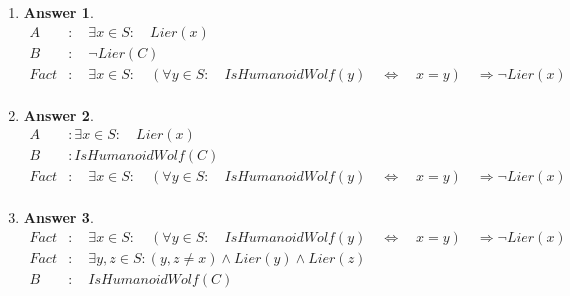 \documentclass[a4paper]{article}
\renewcommand{\(}{\left(}
\renewcommand{\)}{\right)}
\theoremstyle{plain}
\theoremstyle{plain}
\theoremstyle{definition}
\newtheorem*{answer}{Answer}
\begin{document}
\begin{enumerate}[label*=\alph*.,ref=\alph*]
\item \quad
\begin{shaded}
\begin{answer}
\begin{align*}
  A &: \quad \exists x \in S : \quad Lier(x) \\
  B &: \quad \neg Lier(C) \\
  Fact &: \quad \exists x \in S : \quad (\forall y \in S : \quad IsHumanoidWolf(y) \quad \Leftrightarrow \quad x = y) \quad \Rightarrow \neg Lier(x) \\
\end{align*}
\end{answer}
\end{shaded}

\item \quad
\begin{shaded}
\begin{answer}
\begin{align*}
 A &:  \exists x \in S : \quad Lier(x) \\
 B &: IsHumanoidWolf(C) \\
  Fact &: \quad \exists x \in S : \quad (\forall y \in S : \quad IsHumanoidWolf(y) \quad \Leftrightarrow \quad x = y) \quad \Rightarrow \neg Lier(x) \\
\end{align*}
\end{answer}
\end{shaded}

\item \quad
\begin{shaded}
\begin{answer}
\begin{align*}
 Fact &: \quad \exists x \in S : \quad (\forall y \in S : \quad IsHumanoidWolf(y) \quad \Leftrightarrow \quad x = y) \quad \Rightarrow \neg Lier(x) \\
 Fact &: \quad \exists y , z \in S : (y , z \neq x ) \wedge Lier(y) \wedge Lier(z) \\
 B &: \quad IsHumanoidWolf(C)
\end{align*}
\end{answer}
\end{shaded}

\end{enumerate}
\end{document}
